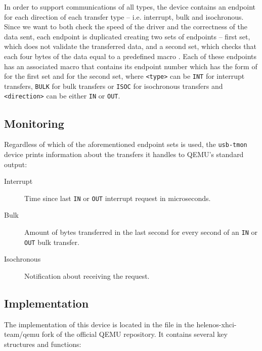 In order to support communications of all types, the device contains an
endpoint for each direction of each transfer type -- i.e. interrupt, bulk and
isochronous. Since we want to both check the speed of the driver and the
correctness of the data sent, each endpoint is duplicated creating two
sets of endpoints -- first set, which does not validate the transferred data,
and a second set, which checks that each four bytes of the data equal to a
predefined macro . Each of these endpoints has an associated
macro that contains its endpoint number which has the form of
 for the first set and
 for the second set, where \texttt{<type>}
can be \texttt{INT} for interrupt transfers, \texttt{BULK} for bulk transfers or
\texttt{ISOC} for isochronous transfers and \texttt{<direction>} can be either
\texttt{IN} or \texttt{OUT}.

\subsection{Monitoring}

Regardless of which of the aforementioned endpoint sets is used, the
\texttt{usb-tmon} device prints information about the transfers it handles
to QEMU's standard output:
%
\begin{description}
	\item[Interrupt]
		Time since last \texttt{IN} or \texttt{OUT} interrupt request in
		microseconds.
	\item[Bulk]
		Amount of bytes transferred in the last second for every second of an
		\texttt{IN} or \texttt{OUT} bulk transfer.
	\item[Isochronous]
		Notification about receiving the request.
\end{description}

\subsection{Implementation}

The implementation of this device is located in the file
 in the helenos-xhci-team/qemu fork of
the official QEMU repository. It contains several key structures and functions:


